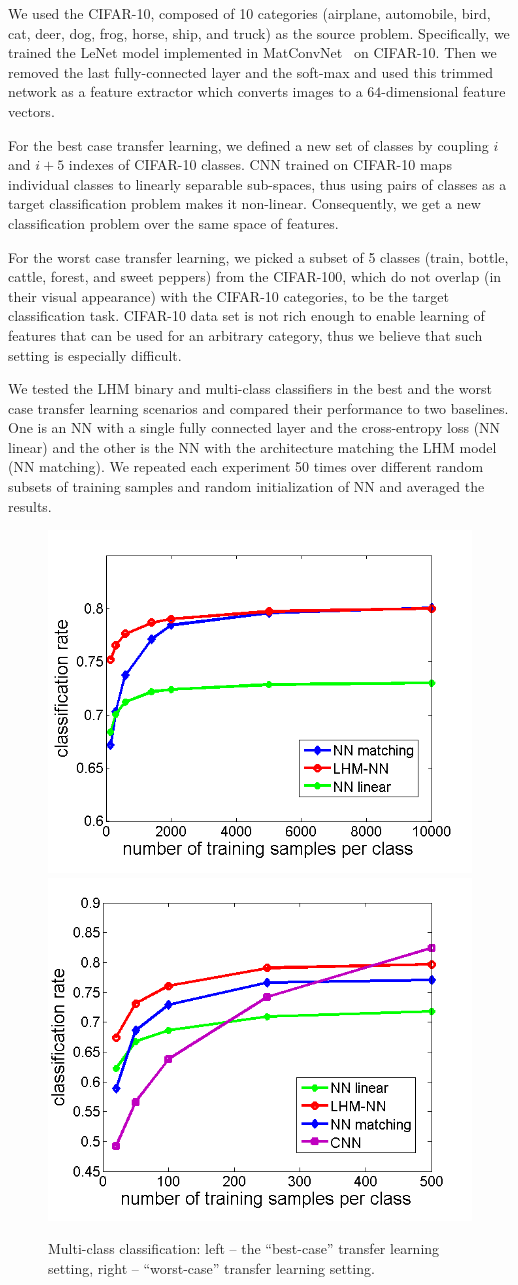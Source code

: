 \documentclass[twoside,11pt]{article}
\begin{document}
We used the CIFAR-10, composed of 10 categories (airplane, automobile, bird, cat, deer, dog, frog, horse, ship, and truck) as the source problem. Specifically, we trained the LeNet model implemented in MatConvNet~\cite{vedaldi15matconvnet} on CIFAR-10. Then we removed the last fully-connected layer and the soft-max and used this trimmed network as a feature extractor which converts images to a $64$-dimensional feature vectors.

For the best case transfer learning, we defined a new set of classes by coupling $i$ and $i+5$ indexes of CIFAR-10 classes. CNN trained on CIFAR-10 maps individual classes to linearly separable sub-spaces, thus using pairs of classes as a target classification problem makes it non-linear. Consequently, we get a new classification problem over the same space of features.

For the worst case transfer learning, we picked a subset of 5 classes (train, bottle, cattle, forest, and sweet peppers) from the CIFAR-100, which do not overlap (in their visual appearance) with the CIFAR-10 categories, to be the target classification task. CIFAR-10 data set is not rich enough to enable learning of features that can be used for an arbitrary category, thus we believe that such setting is especially difficult.


We tested the LHM binary and multi-class classifiers in the best and the worst case transfer learning scenarios and compared their performance to two baselines. One is an NN with a single fully connected  layer and the cross-entropy loss (NN linear) and the other is the NN with the architecture matching the LHM model (NN matching).  We repeated each experiment 50 times over different random subsets of training samples and random initialization of NN and averaged the results.

\begin{figure}[h]
\center
  \includegraphics[width=0.49\linewidth]{mc_pairs_new.png}
  \includegraphics[width=0.49\linewidth]{mc_cifar100_new.png}
  \caption{Multi-class classification: left -- the ``best-case'' transfer learning  setting, right -- ``worst-case'' transfer learning  setting.}
  \label{fig:mc}
\end{figure}
\end{document}
